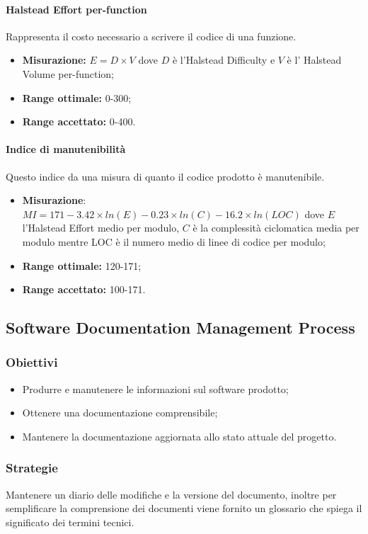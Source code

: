 			\paragraph{Halstead Effort per-function} \Spazio
			Rappresenta il costo necessario a scrivere il codice di una funzione.
			\begin{itemize}
				\item \textbf{Misurazione:} $E=D\times V$ dove $D$ è l'Halstead Difficulty e $V$ è l' Halstead Volume per-function;
				\item \textbf{Range ottimale:} 0-300;
				\item \textbf{Range accettato:} 0-400.
			\end{itemize}
			\paragraph{Indice di manutenibilità}  \Spazio
			Questo indice da una misura di quanto il codice prodotto è manutenibile.
			\begin{itemize}
				\item \textbf{Misurazione}:$MI=171-3.42\times ln(E)-0.23\times ln(C)-16.2\times ln(LOC)$ dove $E$  l'Halstead Effort medio per modulo, $C$ è la complessità ciclomatica media per modulo mentre LOC è il numero medio di linee di codice per modulo;
				\item \textbf{Range ottimale:} 120-171;
				\item \textbf{Range accettato:} 100-171.
			\end{itemize}

	\subsection{Software Documentation Management Process}
		\subsubsection{Obiettivi}
		\begin{itemize}
			\item Produrre e manutenere le informazioni sul software prodotto;
			\item Ottenere una documentazione comprensibile;
			\item Mantenere la documentazione aggiornata allo stato attuale del progetto.
		\end{itemize}
		\subsubsection{Strategie}
		Mantenere un diario delle modifiche e la versione del documento, inoltre per semplificare la comprensione dei documenti viene fornito un glossario che spiega il significato dei termini tecnici. 
